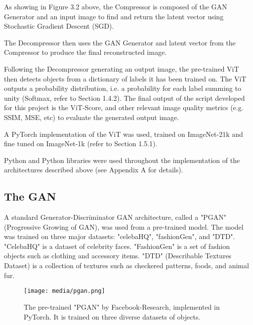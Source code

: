 As showing in Figure 3.2 above, the Compressor is composed of the GAN Generator and an input image to find and return the latent vector using
Stochastic Gradient Descent (SGD).

The Decompressor then uses the GAN Generator and latent vector from the Compressor to produce the final reconstructed image.


Following the Decompressor generating an output image, the pre-trained ViT then detects objects from a 
dictionary of labels it has been trained on. The ViT outputs a probability distribution, i.e. a probability for each label summing to unity (Softmax, refer to Section 1.4.2). 
The final output of the script developed for this project is the ViT-Score, and other relevant image quality metrics (e.g. SSIM, MSE, etc)
to evaluate the generated output image.

A PyTorch implementation of the ViT was used, trained on ImageNet-21k and fine tuned on ImageNet-1k (refer to Section 1.5.1).

Python and Python libraries were used throughout the implementation of the architectures described above (see Appendix A for details).

\subsection{The GAN}

A standard Generator-Discriminator GAN architecture, called a "PGAN" (Progressive Growing of GAN), was used from a pre-trained model.
The model was trained on three major datasets: "celebaHQ", "fashionGen", and "DTD". 
"CelebaHQ" is a dataset of celebrity faces. "FashionGen" is a set of fashion objects such as clothing and accessory items.
"DTD" (Describable Textures Dataset) is a collection of textures such as checkered patterns, foods, and animal fur.
\citep{PytorchGANZoo}

\begin{figure}[H]
	\begin{center}
	\texttt{[image: media/pgan.png]}
	\end{center}
	\caption[The pre-trained "PGAN"]{The pre-trained "PGAN" by Facebook-Research, implemented in PyTorch. 
    It is trained on three diverse datasets of objects.\citep{PytorchGANZoo}}
	\end{figure}


